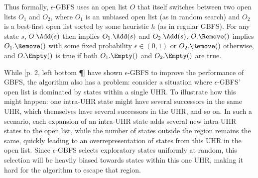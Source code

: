 Thus formally, $\epsilon$-GBFS uses an open list $O$ that itself switches between two open lists $O_1$ and $O_2$, where $O_1$ is an unbiased open list (as in random search) and $O_2$ is a best-first open list sorted by some heuristic $h$ (as in regular GBFS). For any state $s$, $O.\Add(s)$ then implies $O_1.\Add(s)$ and $O_2.\Add(s)$, $O.\Remove()$ implies $O_1.\Remove()$ with some fixed probability $\epsilon\in(0,1)$ or $O_2.\Remove()$ otherwise, and $O.\Empty()$ is true if both $O_1.\Empty()$ and $O_2.\Empty()$ are true.

While [p. 2, left bottom \P] have shown $\epsilon$-GBFS to improve the performance of GBFS, the algorithm also has a problem: consider a situation where $\epsilon$-GBFS' open list is dominated by states within a single UHR. To illustrate how this might happen: one intra-UHR state might have several successors in the same UHR, which themselves have several successors in the UHR, and so on. In such a scenario, each expansion of an intra-UHR state adds several new intra-UHR states to the open list, while the number of states outside the region remains the same, quickly leading to an overrepresentation of states from this UHR in the open list. Since $\epsilon$-GBFS selects exploratory states uniformly at random, this selection will be heavily biased towards states within this one UHR, making it hard for the algorithm to escape that region.




